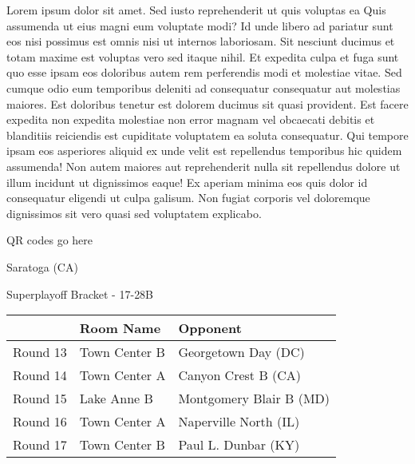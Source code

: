 \documentclass{article}%
\begin{document}
\vspace*{8pt}%
\linebreak%
\newline%
\newline%
Lorem ipsum dolor sit amet. Sed iusto reprehenderit ut quis voluptas ea Quis assumenda ut eius magni eum voluptate modi? Id unde libero ad pariatur sunt eos nisi possimus est omnis nisi ut internos laboriosam. Sit nesciunt ducimus et totam maxime est voluptas vero sed itaque nihil. Et expedita culpa et fuga sunt quo esse ipsam eos doloribus autem rem perferendis modi et molestiae vitae.\newline%
\newline%
Sed cumque odio eum temporibus deleniti ad consequatur consequatur aut molestias maiores. Est doloribus tenetur est dolorem ducimus sit quasi provident. Est facere expedita non expedita molestiae non error magnam vel obcaecati debitis et blanditiis reiciendis est cupiditate voluptatem ea soluta consequatur. Qui tempore ipsam eos asperiores aliquid ex unde velit est repellendus temporibus hic quidem assumenda!\newline%
\newline%
Non autem maiores aut reprehenderit nulla sit repellendus dolore ut illum incidunt ut dignissimos eaque! Ex aperiam minima eos quis dolor id consequatur eligendi ut culpa galisum. Non fugiat corporis vel doloremque dignissimos sit vero quasi sed voluptatem explicabo.\newline%
\newline%
%
\vspace*{30pt}%
\begin{center}%
\begin{Huge}%
QR codes go here%
\end{Huge}%
\end{center}%
\newpage%
\begin{center}%
\begin{Huge}%
Saratoga (CA)%
\end{Huge}%
\vspace*{8pt}%
\linebreak%
\begin{Large}%
Superplayoff Bracket {-} 17{-}28B%
\end{Large}%
\end{center}%
%
\begin{tabularx}{\textwidth}{|c|Y|Y|}%
\hline%
&Room Name&Opponent\\%
\hline%
Round 13&Town Center B&Georgetown Day (DC)\\%
Round 14&Town Center A&Canyon Crest B (CA)\\%
Round 15&Lake Anne B&Montgomery Blair B (MD)\\%
Round 16&Town Center A&Naperville North (IL)\\%
Round 17&Town Center B&Paul L. Dunbar (KY)\\%
\hline%
\end{tabularx}%
\end{document}
